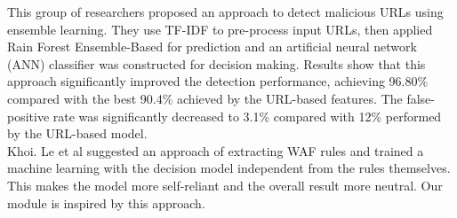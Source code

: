 \newline
This group of researchers \cite{s22093373} proposed an approach to detect malicious URLs using ensemble learning. They use TF-IDF to pre-process input URLs, then applied Rain Forest Ensemble-Based for prediction and an artificial neural network (ANN) classifier was constructed for decision making. Results show that this approach significantly improved the detection performance, achieving 96.80\% compared with the best 90.4\% achieved by the URL-based features. The false-positive rate was significantly decreased to 3.1\% compared with 12\% performed by the URL-based model. \\ \newline
Khoi. Le et al \cite{Khoi} suggested an approach of extracting WAF rules and trained a machine learning with the decision model independent from the rules themselves. This makes the model more self-reliant and the overall result more neutral. Our module is inspired by this approach.\\ 
